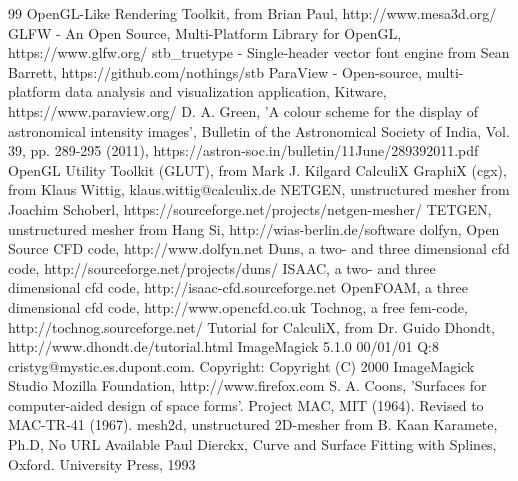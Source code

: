 \documentclass{article}
\begin{document}
\begin{thebibliography}{99}
 OpenGL-Like Rendering Toolkit, from Brian Paul, http://www.mesa3d.org/ 
 GLFW - An Open Source, Multi-Platform Library for OpenGL, https://www.glfw.org/
 stb\_truetype - Single-header vector font engine from Sean Barrett, https://github.com/nothings/stb
 ParaView - Open-source, multi-platform data analysis and visualization application, Kitware, https://www.paraview.org/
 D. A. Green, 'A colour scheme for the display of astronomical intensity images', Bulletin of the Astronomical Society of India, Vol. 39, pp. 289-295 (2011), https://astron-soc.in/bulletin/11June/289392011.pdf
 OpenGL Utility Toolkit (GLUT), from Mark J. Kilgard
 CalculiX GraphiX (cgx), from Klaus Wittig, klaus.wittig@calculix.de
 NETGEN, unstructured mesher from Joachim Schoberl, https://sourceforge.net/projects/netgen-mesher/
 TETGEN, unstructured mesher from Hang Si, http://wias-berlin.de/software
 dolfyn, Open Source CFD code, http://www.dolfyn.net
 Duns, a two- and three dimensional cfd code, http://sourceforge.net/projects/duns/
 ISAAC, a two- and three dimensional cfd code, http://isaac-cfd.sourceforge.net
 OpenFOAM, a three dimensional cfd code, http://www.opencfd.co.uk
 Tochnog, a free fem-code, http://tochnog.sourceforge.net/
 Tutorial for CalculiX, from Dr. Guido Dhondt, http://www.dhondt.de/tutorial.html
 ImageMagick 5.1.0 00/01/01 Q:8 cristyg@mystic.es.dupont.com. Copyright: Copyright (C) 2000 ImageMagick Studio 
 Mozilla Foundation, http://www.firefox.com
 S. A. Coons, 'Surfaces for computer-aided design of space forms'. Project MAC, MIT (1964). Revised to MAC-TR-41 (1967). 
 mesh2d, unstructured 2D-mesher from B. Kaan Karamete, Ph.D, No URL Available
 Paul Dierckx, Curve and Surface Fitting with Splines, Oxford. University Press, 1993
\end{thebibliography}
\end{document}
